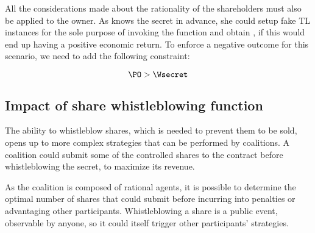 All the considerations made about the rationality of the shareholders must also be applied to the owner.
As \owner knows the secret in advance, she could setup fake TL instances for the sole purpose of invoking the \texttt{\algowhistleblowsecret} function and obtain \Wsecret, if this would end up having a positive economic return.
%
To enforce a negative outcome for this scenario, we need to add the following constraint:

\begin{equation}\label{eqbalance3}
\PO > \Wsecret
\end{equation}





\subsection{Impact of share whistleblowing function}\label{sect:impact_wh}

The ability to whistleblow shares, which is needed to prevent them to be sold, opens up to more complex strategies that can be performed by coalitions.
A coalition \coalition
could submit some of the controlled shares to the contract before whistleblowing the secret, to maximize its revenue.

As the coalition is composed of rational agents, it is possible to determine the optimal number \jopt of shares that \coalition could submit before incurring into penalties or advantaging other participants.
Whistleblowing a share is a public event, observable by anyone, so it could itself trigger other participants' strategies.

